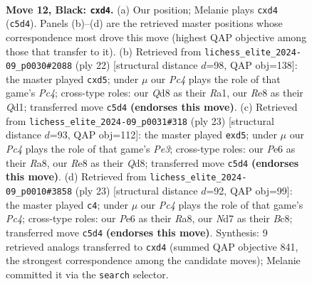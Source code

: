 \documentclass[11pt]{article}
\begin{document}
\clearpage

\begin{figure}[p]\centering
\begin{subfigure}{0.46\textwidth}\centering
\resizebox{\linewidth}{!}{%
\newchessgame
\chessboard[
  setfen={r1bqrk2/pp1nbppp/2n1p3/2p5/2PP2P1/1P3N1B/P2P1P1P/RNBQ1RK1 b - - 0 12},
  showmover=false,
  pgfstyle=straightmove, color=movearrow, markmove={c5-d4}
]}
\caption{}
\end{subfigure}\hfill
\begin{subfigure}{0.46\textwidth}\centering
\resizebox{\linewidth}{!}{%
\newchessgame
\chessboard[
  setfen={r1bq1rk1/pp2ppbp/3p1npn/3p4/2P1PP2/2N2N1P/PP1BB1P1/R2QK2R w KQ - 0 12},
  showmover=false,
  pgfstyle=straightmove, color=movearrow, markmove={c4-d5}
]}
\caption{}
\end{subfigure}
\\[4pt]
\begin{subfigure}{0.46\textwidth}\centering
\resizebox{\linewidth}{!}{%
\newchessgame
\chessboard[
  setfen={r2qkb1r/1p1b1ppp/pn2pn2/2pP4/4P3/1PN2N2/P1Q2PPP/R1B2RK1 b kq - 0 12},
  showmover=false,
  pgfstyle=straightmove, color=movearrow, markmove={e6-d5}
]}
\caption{}
\end{subfigure}\hfill
\begin{subfigure}{0.46\textwidth}\centering
\resizebox{\linewidth}{!}{%
\newchessgame
\chessboard[
  setfen={r1bq1rk1/3nbppp/p1n5/1pppP3/3P4/5NP1/PP2QPBP/RNBR2K1 b - - 0 12},
  showmover=false,
  pgfstyle=straightmove, color=movearrow, markmove={c5-c4}
]}
\caption{}
\end{subfigure}
\caption{\textbf{Move 12, Black: \texttt{cxd4}.} (a) Our position; Melanie plays \texttt{cxd4} (\texttt{c5d4}). Panels (b)--(d) are the retrieved master positions whose correspondence most drove this move (highest QAP objective among those that transfer to it). (b) Retrieved from \texttt{lichess\_elite\_2024-09\_p0030\#2088} (ply 22) [structural distance $d$=98, QAP obj=138]: the master played \texttt{cxd5}; under $\mu$ our \emph{Pc4} plays the role of that game's \emph{Pc4}; cross-type roles: our \emph{Q}d8 as their \emph{R}a1, our \emph{R}e8 as their \emph{Q}d1; transferred move \texttt{c5d4} \textbf{(endorses this move)}. (c) Retrieved from \texttt{lichess\_elite\_2024-09\_p0031\#318} (ply 23) [structural distance $d$=93, QAP obj=112]: the master played \texttt{exd5}; under $\mu$ our \emph{Pc4} plays the role of that game's \emph{Pe3}; cross-type roles: our \emph{P}e6 as their \emph{R}a8, our \emph{R}e8 as their \emph{Q}d8; transferred move \texttt{c5d4} \textbf{(endorses this move)}. (d) Retrieved from \texttt{lichess\_elite\_2024-09\_p0010\#3858} (ply 23) [structural distance $d$=92, QAP obj=99]: the master played \texttt{c4}; under $\mu$ our \emph{Pc4} plays the role of that game's \emph{Pc4}; cross-type roles: our \emph{P}e6 as their \emph{R}a8, our \emph{N}d7 as their \emph{B}c8; transferred move \texttt{c5d4} \textbf{(endorses this move)}. Synthesis: 9 retrieved analogs transferred to \texttt{cxd4} (summed QAP objective 841, the strongest correspondence among the candidate moves); Melanie committed it via the \texttt{search} selector.}
\label{fig:thought-m23}
\end{figure}
\end{document}
